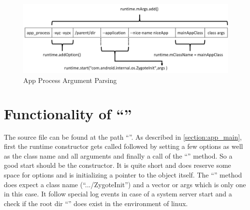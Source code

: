 \begin{figure}[htb]
  \centering
  \includegraphics[width=\textwidth]{figures/app_process}
  \caption[App Process Argument Parsing]{App Process Argument Parsing}
  \label{fig:app_process}
\end{figure}


\section{Functionality of ``''}
The source file can be found at the path ``''. As described in \autoref{section:app_main}, first the runtime constructor gets called followed by setting a few options as well as
the class name and all arguments and finally a call of the ``''
method. So a good start should be the constructor. It is quite short and
does reserve some space for options and is initializing a pointer to the object
itself.
The ``'' method does expect a class name (``.../ZygoteInit'') and a vector or args which is only one in this case. It follow
special log events in case of a system server start and a check if the root
dir ``'' does exist in the environment of linux.


